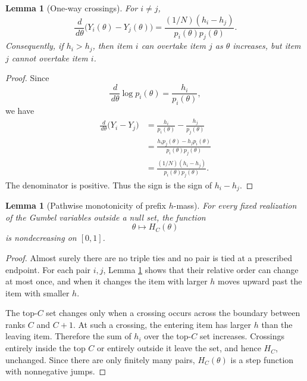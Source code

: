 \documentclass[11pt]{article}
\newtheorem{lemma}[theorem]{Lemma}
\newcommand{\dd}{\,d}
\newcommand{\1}{\mathbf 1}
\begin{document}
\begin{lemma}[One-way crossings]\label{lem:one-way-crossings}
For $i\ne j$,
\begin{equation}\label{eq:gap-derivative}
        \frac{\dd}{\dd\theta}\bigl(Y_i(\theta)-Y_j(\theta)\bigr)
        =\frac{(1/N)(h_i-h_j)}{p_i(\theta)p_j(\theta)}.
\end{equation}
Consequently, if $h_i>h_j$, then item $i$ can overtake item $j$ as $\theta$ increases,
but item $j$ cannot overtake item $i$.
\end{lemma}

\begin{proof}
Since
\[
        \frac{\dd}{\dd\theta}\log p_i(\theta)=\frac{h_i}{p_i(\theta)},
\]
we have
\[
\begin{aligned}
        \frac{\dd}{\dd\theta}\bigl(Y_i-Y_j\bigr)
        &=\frac{h_i}{p_i(\theta)}-\frac{h_j}{p_j(\theta)}  \\
        &=\frac{h_ip_j(\theta)-h_jp_i(\theta)}{p_i(\theta)p_j(\theta)} \\
        &=\frac{(1/N)(h_i-h_j)}{p_i(\theta)p_j(\theta)}.
\end{aligned}
\]
The denominator is positive.  Thus the sign is the sign of $h_i-h_j$.
\end{proof}

\begin{lemma}[Pathwise monotonicity of prefix $h$-mass]\label{lem:H-pathwise}
For every fixed realization of the Gumbel variables outside a null set, the function
\[
        \theta\mapsto H_C(\theta)
\]
is nondecreasing on $[0,1]$.
\end{lemma}

\begin{proof}
Almost surely there are no triple ties and no pair is tied at a prescribed endpoint.  For
each pair $i,j$, Lemma \ref{lem:one-way-crossings} shows that their relative order can
change at most once, and when it changes the item with larger $h$ moves upward past the
item with smaller $h$.

The top-$C$ set changes only when a crossing occurs across the boundary between ranks $C$
and $C+1$.  At such a crossing, the entering item has larger $h$ than the leaving item.
Therefore the sum of $h_i$ over the top-$C$ set increases.  Crossings entirely inside the
top $C$ or entirely outside it leave the set, and hence $H_C$, unchanged.  Since there are
only finitely many pairs, $H_C(\theta)$ is a step function with nonnegative jumps.
\end{proof}
\end{document}
